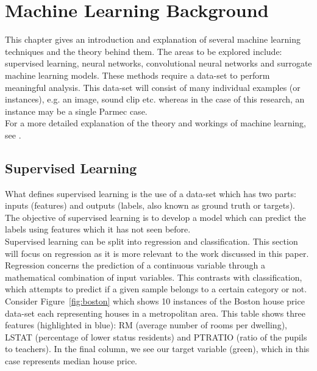 \chapter{Machine Learning Background}
\label{cha:ML}

This chapter gives an introduction and explanation of several machine learning techniques and the theory behind them. The areas to be explored include: supervised learning, neural networks, convolutional neural networks and surrogate machine learning models. These methods require a data-set to perform meaningful analysis. This data-set will consist of many individual examples (or instances), e.g. an image, sound clip etc. whereas in the case of this research, an instance may be a single Parmec case.
\\

\noindent
For a more detailed explanation of the theory and workings of machine learning, see \cite{bishop2006pattern}.


\section{Supervised Learning} \label{supervised}

What defines supervised learning is the use of a data-set which has two parts: inputs (features) and outputs (labels, also known as ground truth or targets). The objective of supervised learning is to develop a model which can predict the labels using features which it has not seen before.
\\

\noindent
Supervised learning can be split into regression and classification. This section will focus on regression as it is more relevant to the work discussed in this paper. Regression concerns the prediction of a continuous variable through a mathematical combination of input variables. This contrasts with classification, which attempts to predict if a given sample belongs to a certain category or not.
\\

\noindent
Consider Figure~\ref{fig:boston} which shows 10 instances of the Boston house price data-set \cite{harrison1978hedonic} each representing houses in a metropolitan area. This table shows three features (highlighted in blue): RM (average number of rooms per dwelling), LSTAT (percentage of lower status residents) and PTRATIO (ratio of the pupils to teachers). In the final column, we see our target variable (green), which in this case represents median house price. 
\\

